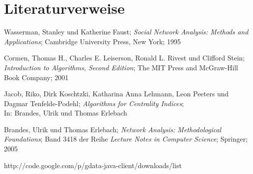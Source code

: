\section{Literaturverweise}
	\begin{thebibliography}{mustermarke}
	
		 Wasserman, Stanley und Katherine Faust; \textit{Social Network Analysis: Methods and Applications}; Cambridge University Press, New York; 1995
	
		 Cormen, Thomas H., Charles E. Leiserson, Ronald L. Rivest und Clifford Stein; \textit{Introduction to Algorithms, Second Edition}; The MIT Press and McGraw-Hill Book Company; 2001
		
			 Jacob, Riko, Dirk Koschtzki, Katharina Anna Lehmann, Leon Peeters und Dagmar Tenfelde-Podehl; \textit{Algorithms for Centrality Indices};\\
		In: Brandes, Ulrik und Thomas Erlebach
	
		 Brandes, Ulrik und Thomas Erlebach; \textit{Network Analysis: Methodological Foundations}; Band 3418 der Reihe \textit{Lecture Notes in Computer Science}; Springer; 2005
	
	
	http://code.google.com/p/gdata-java-client/downloads/list
	\end{thebibliography}
